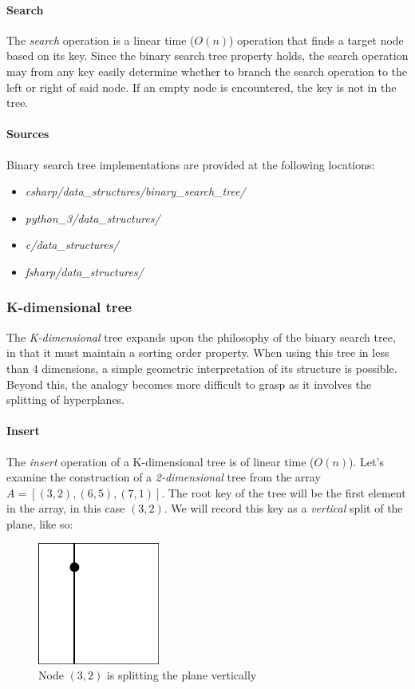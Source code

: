 \documentclass{article}
\begin{document}
\paragraph{Search}
The {\em search} operation is a linear time (\(O(n)\)) operation that finds a target node based on its key.
Since the binary search tree property holds, the search operation may from any key easily determine whether to
branch the search operation to the left or right of said node. If an empty node is encountered, the key is
not in the tree.

\paragraph{Sources}
Binary search tree implementations are provided at the following locations:
\begin{itemize}
\item{{\em csharp/data\_structures/binary\_search\_tree/}}
\item{{\em python\_3/data\_structures/}}
\item{{\em c/data\_structures/}}
\item{{\em fsharp/data\_structures/}}
\end{itemize}


\subsubsection{K-dimensional tree}
The {\em K-dimensional} tree expands upon the philosophy of the binary search tree, in that it
must maintain a sorting order property. When using this tree in less than 4 dimensions,
a simple geometric interpretation of its structure is possible. Beyond this, the analogy becomes
more difficult to grasp as it involves the splitting of hyperplanes.

\paragraph{Insert}
The {\em insert} operation of a K-dimensional tree is of linear time (\(O(n)\)).
Let's examine the construction of a {\em 2-dimensional} tree from the array \(A = [(3, 2), (6, 5), (7, 1)]\).
The root key of the tree will be the first element in the array, in this case \((3, 2)\).
We will record this key as a {\em vertical} split of the plane, like so:

\begin{figure}[H]
  \centering
  \includegraphics[width=4cm]{2d_tree_0}
  \caption{Node \((3, 2)\) is splitting the plane vertically}
\end{figure}
\end{document}
